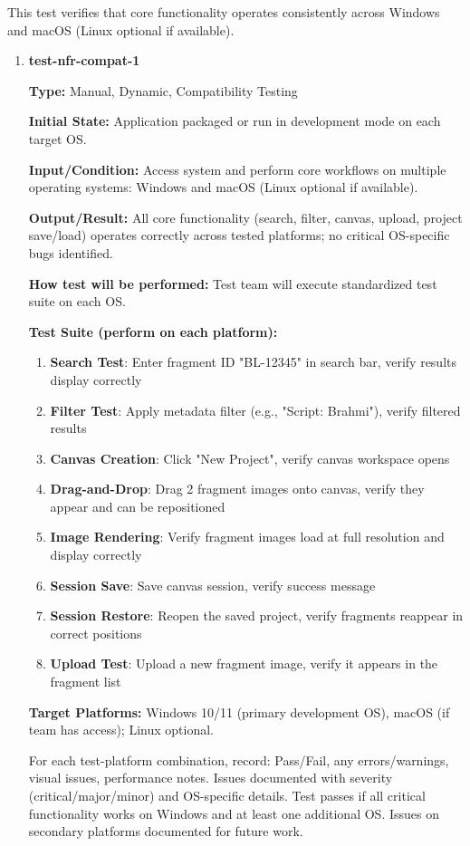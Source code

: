 \documentclass[12pt, titlepage]{article}
\begin{document}
This test verifies that core functionality operates consistently across Windows and macOS (Linux optional if available).

\begin{enumerate}

\item \textbf{test-nfr-compat-1}

\textbf{Type:} Manual, Dynamic, Compatibility Testing
					
\textbf{Initial State:} Application packaged or run in development mode on each target OS.
					
\textbf{Input/Condition:} Access system and perform core workflows on multiple operating systems: Windows and macOS (Linux optional if available).
					
\textbf{Output/Result:} All core functionality (search, filter, canvas, upload, project save/load) operates correctly across tested platforms; no critical OS-specific bugs identified.
					
\textbf{How test will be performed:} Test team will execute standardized test suite on each OS.

\textbf{Test Suite (perform on each platform):}
\begin{enumerate}
\item \textbf{Search Test}: Enter fragment ID "BL-12345" in search bar, verify results display correctly
\item \textbf{Filter Test}: Apply metadata filter (e.g., "Script: Brahmi"), verify filtered results
\item \textbf{Canvas Creation}: Click "New Project", verify canvas workspace opens
\item \textbf{Drag-and-Drop}: Drag 2 fragment images onto canvas, verify they appear and can be repositioned
\item \textbf{Image Rendering}: Verify fragment images load at full resolution and display correctly
\item \textbf{Session Save}: Save canvas session, verify success message
\item \textbf{Session Restore}: Reopen the saved project, verify fragments reappear in correct positions
\item \textbf{Upload Test}: Upload a new fragment image, verify it appears in the fragment list
\end{enumerate}
\textbf{Target Platforms:} Windows 10/11 (primary development OS), macOS (if team has access); Linux optional.

For each test-platform combination, record: Pass/Fail, any errors/warnings, visual issues, performance notes. Issues documented with severity (critical/major/minor) and OS-specific details. Test passes if all critical functionality works on Windows and at least one additional OS. Issues on secondary platforms documented for future work.

\end{enumerate}
\end{document}
